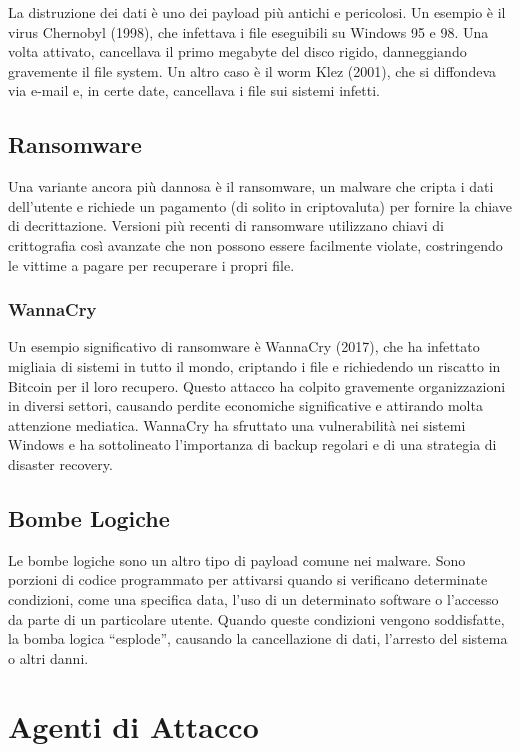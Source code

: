 La distruzione dei dati è uno dei payload più antichi e pericolosi. Un esempio è il virus Chernobyl (1998), che infettava i file eseguibili su Windows 95 e 98. Una volta attivato, cancellava il primo megabyte del disco rigido, danneggiando gravemente il file system. Un altro caso è il worm Klez (2001), che si diffondeva via e-mail e, in certe date, cancellava i file sui sistemi infetti.

\subsection{Ransomware}

Una variante ancora più dannosa è il ransomware, un malware che cripta i dati dell'utente e richiede un pagamento (di solito in criptovaluta) per fornire la chiave di decrittazione. Versioni più recenti di ransomware utilizzano chiavi di crittografia così avanzate che non possono essere facilmente violate, costringendo le vittime a pagare per recuperare i propri file.

\subsubsection{WannaCry}

Un esempio significativo di ransomware è WannaCry (2017), che ha infettato migliaia di sistemi in tutto il mondo, criptando i file e richiedendo un riscatto in Bitcoin per il loro recupero. Questo attacco ha colpito gravemente organizzazioni in diversi settori, causando perdite economiche significative e attirando molta attenzione mediatica. WannaCry ha sfruttato una vulnerabilità nei sistemi Windows e ha sottolineato l'importanza di backup regolari e di una strategia di disaster recovery.

\subsection{Bombe Logiche}

Le bombe logiche sono un altro tipo di payload comune nei malware. Sono porzioni di codice programmato per attivarsi quando si verificano determinate condizioni, come una specifica data, l'uso di un determinato software o l'accesso da parte di un particolare utente. Quando queste condizioni vengono soddisfatte, la bomba logica ``esplode'', causando la cancellazione di dati, l'arresto del sistema o altri danni.

\section{Agenti di Attacco}

